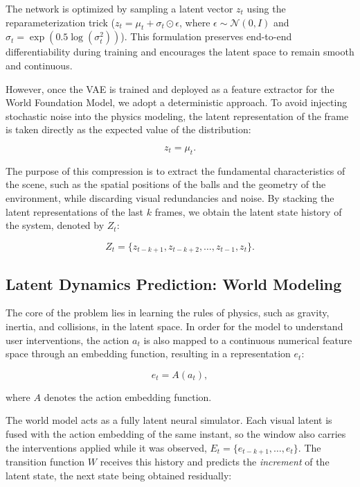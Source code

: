 \documentclass[conference]{IEEEtran}
\begin{document}
The network is optimized by sampling a latent vector $z_t$ using the reparameterization trick ($z_t = \mu_t + \sigma_t \odot \epsilon$, where $\epsilon \sim \mathcal{N}(0, I)$ and $\sigma_t = \exp(0.5 \log(\sigma_t^2))$). This formulation preserves end-to-end differentiability during training and encourages the latent space to remain smooth and continuous.

However, once the VAE is trained and deployed as a feature extractor for the World Foundation Model, we adopt a deterministic approach. To avoid injecting stochastic noise into the physics modeling, the latent representation of the frame is taken directly as the expected value of the distribution:

\begin{equation}
    z_t = \mu_t.
\end{equation} 

The purpose of this compression is to extract the fundamental characteristics of the scene, such as the spatial positions of the balls and the geometry of the environment, while discarding visual redundancies and noise. By stacking the latent representations of the last $k$ frames, we obtain the latent state history of the system, denoted by $Z_t$:

\begin{equation}
    Z_t = \{z_{t-k+1}, z_{t-k+2}, \ldots, z_{t-1}, z_t\}.
\end{equation}

\subsection{Latent Dynamics Prediction: World Modeling}

The core of the problem lies in learning the rules of physics, such as gravity, inertia, and collisions, in the latent space. In order for the model to understand user interventions, the action \(a_t\) is also mapped to a continuous numerical feature space through an embedding function, resulting in a representation \(e_t\):

\begin{equation}
    e_t = A(a_t),
\end{equation}

where \(A\) denotes the action embedding function.

The world model acts as a fully latent neural simulator. Each visual latent is fused with the action embedding of the same instant, so the window also carries the interventions applied while it was observed, $E_t = \{e_{t-k+1}, \ldots, e_t\}$. The transition function \(W\) receives this history and predicts the \emph{increment} of the latent state, the next state being obtained residually:
\end{document}
